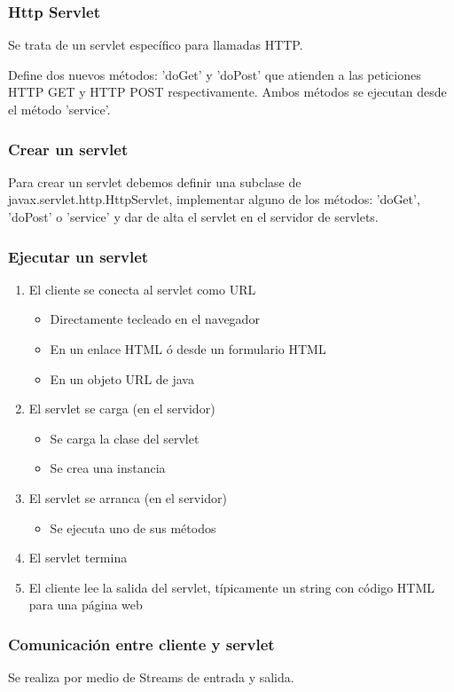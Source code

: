 \documentclass{apuntes}
\begin{document}
\subsubsection{Http Servlet}
Se trata de un servlet específico para llamadas HTTP.

Define dos nuevos métodos: 'doGet' y 'doPost' que atienden a las peticiones HTTP GET y HTTP POST respectivamente. Ambos métodos se ejecutan desde el método 'service'.

\subsubsection{Crear un servlet}
Para crear un servlet debemos definir una subclase de javax.servlet.http.HttpServlet, implementar alguno de los métodos: 'doGet', 'doPost' o 'service' y dar de alta el servlet en el servidor de servlets.

\subsubsection{Ejecutar un servlet}
\begin{enumerate}
\item El cliente se conecta al servlet como URL
\begin{itemize}
\item Directamente tecleado en el navegador
\item En un enlace HTML ó desde un formulario HTML
\item En un objeto URL de java
\end{itemize}
\item El servlet se carga (en el servidor)
\begin{itemize}
\item Se carga la clase del servlet
\item Se crea una instancia
\end{itemize}
\item El servlet se arranca (en el servidor)
\begin{itemize}
\item Se ejecuta uno de sus métodos
\end{itemize}
\item El servlet termina
\item El cliente lee la salida del servlet, típicamente un string con código HTML para una página web
\end{enumerate}

\subsubsection{Comunicación entre cliente y servlet}
Se realiza por medio de Streams de entrada y salida.
\end{document}
